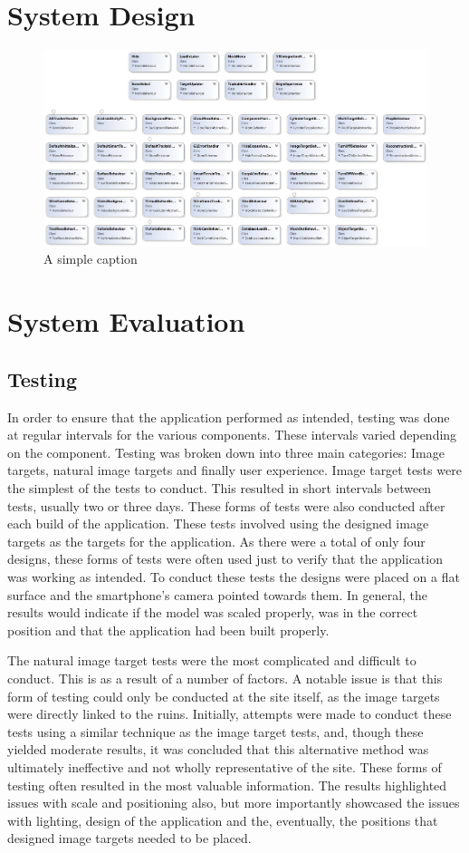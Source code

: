 \chapter{System Design}
\begin{figure}[ht!]
	\centering
	\includegraphics[width=150mm]{uml.jpg}
	\caption{A simple caption \label{overflow}}
\end{figure}

\chapter{System Evaluation}
\section{Testing}
In order to ensure that the application performed as intended, testing was done at regular intervals for the various components. These intervals varied depending on the component.
Testing was broken down into three main categories: Image targets, natural image targets and finally user experience.
Image target tests were the simplest of the tests to conduct. This resulted in short intervals between tests, usually two or three days. These forms of tests were also conducted after each build of the application. These tests involved using the designed image targets as the targets for the application. As there were a total of only four designs, these forms of tests were often used just to verify that the application was working as intended. To conduct these tests the designs were placed on a flat surface and the smartphone's camera pointed towards them. In general, the results would indicate if the model was scaled properly, was in the correct position and that the application had been built properly.

The natural image target tests were the most complicated and difficult to conduct. This is as a result of a number of factors. A notable issue is that this form of testing could only be conducted at the site itself, as the image targets were directly linked to the ruins. Initially, attempts were made to conduct these tests using a similar technique as the image target tests, and, though these yielded moderate results, it was concluded that this alternative method was ultimately ineffective and not wholly representative of the site. These forms of testing often resulted in the most valuable information. The results highlighted issues with scale and positioning also, but more importantly showcased the issues with lighting, design of the application and the, eventually, the positions that designed image targets needed to be placed.

